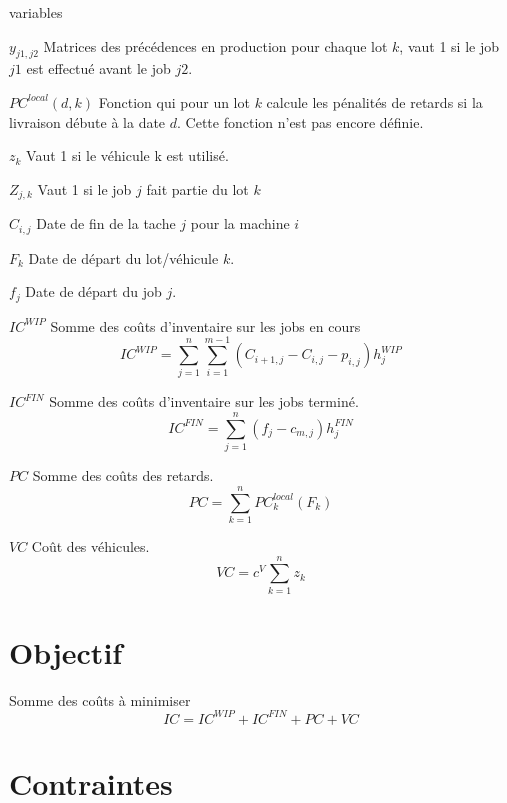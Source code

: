 \documentclass{article}
\begin{document}
        \begin{labeling}{variables}
            \item [$y_{j1,j2}$] Matrices des précédences en production pour chaque lot $k$, vaut 1 si le job $j1$ est effectué avant le job $j2$. 
            \item [$PC^{local}\left(d,k\right)$] Fonction qui pour un lot $k$ calcule les pénalités de retards si la livraison débute à la date $d$. Cette fonction n’est pas encore définie.
            \item [$z_k$] Vaut 1 si le véhicule k est utilisé.
            \item [$Z_{j,k}$] Vaut 1 si le job $j$ fait partie du lot $k$
            \item [$C_{i,j}$] Date de fin de la tache $j$ pour la machine $i$
            \item [$F_k$] Date de départ du lot/véhicule $k$.
            \item [$f_j$] Date de départ du job $j$.
            \item [$IC^{WIP}$] Somme des coûts d’inventaire sur les jobs en cours
            $$IC^{WIP}=\sum_{j=1}^{n}\sum_{i=1}^{m-1}{\left(C_{i+1,j}-C_{i,j}-p_{i,j}\right)h_j^{WIP}}$$
            
            \item [$IC^{FIN}$] Somme des coûts d’inventaire sur les jobs terminé.
            $${IC}^{FIN}=\sum_{j=1}^{n}{\left(f_j-c_{m,j}\right)h_j^{FIN}}$$
            \item [$PC$] Somme des coûts des retards.
            $$PC=\sum_{k=1}^{n}{PC_k^{local}\left(F_k\right)}$$
            \item[$VC$] Coût des véhicules.
            $$VC=c^V\sum_{k=1}^{n}z_k$$
            
        \end{labeling}
    
    
    \section*{Objectif}
        Somme des coûts à minimiser 
        $$IC=IC^{WIP}+IC^{FIN}+PC+VC$$
        
    
    \section*{Contraintes}
    
\end{document}
